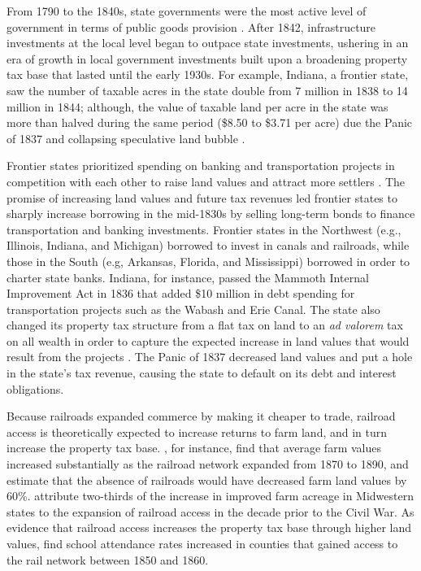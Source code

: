 From 1790 to the 1840s, state governments were the most active level of government in terms of public goods provision \citep{wallis2000american}. After 1842, infrastructure investments at the local level began to outpace state investments, ushering in an era of growth in local government investments built upon a broadening property tax base that lasted until the early 1930s. For example, Indiana, a frontier state, saw the number of taxable acres in the state double from 7 million in 1838 to 14 million in 1844; although, the value of taxable land per acre in the state was more than halved during the same period (\$8.50 to \$3.71 per acre) due the Panic of 1837 and collapsing speculative land bubble \citep{wallis2004sovereign}. 

Frontier states prioritized spending on banking and transportation projects in competition with each other to raise land values and attract more settlers \citep{sylla1998anatomy}. The promise of increasing land values and future tax revenues led frontier states to sharply increase borrowing in the mid-1830s by selling long-term bonds to finance transportation and banking investments. Frontier states in the Northwest (e.g., Illinois, Indiana, and Michigan) borrowed to invest in canals and railroads, while those in the South (e.g, Arkansas, Florida, and Mississippi) borrowed in order to charter state banks. Indiana, for instance, passed the Mammoth Internal Improvement Act in 1836 that added \$10 million in debt spending for transportation projects such as the Wabash and Erie Canal. The state also changed its property tax structure from a flat tax on land to an \emph{ad valorem} tax on all wealth in order to capture the expected increase in land values that would result from the projects \citep{wallis2004sovereign}. The Panic of 1837 decreased land values and put a hole in the state's tax revenue, causing the state to default on its debt and interest obligations.

Because railroads expanded commerce by making it cheaper to trade, railroad access is theoretically expected to increase returns to farm land, and in turn increase the property tax base. \citet{donaldson2016railroads}, for instance, find that average farm values increased substantially as the railroad network expanded from 1870 to 1890, and estimate that the absence of railroads would have decreased farm land values by 60\%. \citet{atack2011impact} attribute two-thirds of the increase in improved farm acreage in Midwestern states to the expansion of railroad access in the decade prior to the Civil War. As evidence that railroad access increases the property tax base through higher land values, \citet{atack2012impact} find school attendance rates increased in counties that gained access to the rail network between 1850 and 1860. 


